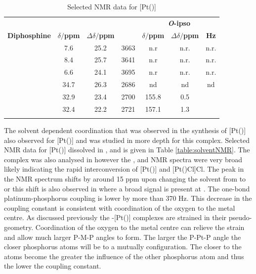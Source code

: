 \begin{table}[htbp]
\caption[Selected NMR data for [Pt(\tBuxantphos)\ce{Cl2}{]}]{Selected NMR data for [Pt(\tBuxantphos)]}
\vspace{1em}
\label{table:PtCl2NMR}
\small
\begin{center}
\begin{tabular}{c c c c c c c}
\toprule{}
	~~ & \multicolumn{3}{c}{\bfseries{\phosphorus}} & \multicolumn{3}{c}{\bfseries{\carbon{} \emph{O}-ipso}}\\
	\cmidrule(lr){2-4} \cmidrule(lr){5-7}
	\bfseries{Diphosphine}&\bfseries{$\delta/$ppm}&\bfseries{$\Delta\delta/$ppm}&\bfseries{\JPtP}&\bfseries{$\delta/$ppm}&\bfseries{$\Delta\delta/$ppm}&\bfseries{\J{} Hz} \\
	\midrule{}
	\PhSixantphos\cite{Kranenburg1998b}	& 7.6	   & 25.2 & 3663 & n.r & n.r. & n.r.\\
	\PhThixantphos	\cite{Kranenburg1998b}	& 8.4   & 25.7 & 3641 & n.r & n.r. & n.r.\\
	\PhXantphos\cite{Kranenburg1998b}		& 6.6	   & 24.1 & 3695 & n.r & n.r. & n.r.\\
	\tBuSixantphos 		& 34.7 & 26.3 & 2686 & nd & nd & nd \\
	\tBuThixantphos 	& 32.9 & 23.4 & 2700 & 155.8 & 0.5 & \fixme{XXX}\\
	\tBuXantphos		& 32.4 & 22.2 & 2721 & 157.1 & 1.3 & \fixme{XXX}\\
	\bottomrule{}
\end{tabular}
\end{center}
\end{table}

The solvent dependent coordination that was observed in the synthesis of [Pt(\tButhixantphos)] also observed for [Pt(\tBuxantphos)] and was studied in more depth for this complex.  Selected NMR data for [Pt(\tBuxantphos)] dissolved in ,  and  is given in Table \ref{table:solventNMR}.  The complex was also analysed in  however the \proton{}, \carbon{} and \phosphorus{} NMR spectra were very broad likely indicating the rapid interconversion of [Pt(\tBuxantphos)] and [Pt(\tBuxantphosk)Cl]Cl.  The peak in the \phosphorus{} NMR spectrum shifts by around 15 ppm upon changing the solvent from  to  or  this shift is also observed in  where a broad signal is present at .  The one-bond platinum-phosphorus coupling is lower by more than 370 Hz.  This decrease in the coupling constant is consistent with coordination of the oxygen to the metal centre.  As discussed previously the \trans-[Pt(\tBuxantphos)] complexes are strained in their pseudo-\trans{} geometry.  Coordination of the oxygen to the metal centre can relieve the strain and allow much larger P-M-P angles to form.  The larger the P-Pt-P angle the closer phosphorus atoms will be to a mutually \trans{} configuration.  The closer to \trans{} the atoms become the greater the influence of the other phosphorus atom and thus the lower the coupling constant.  

